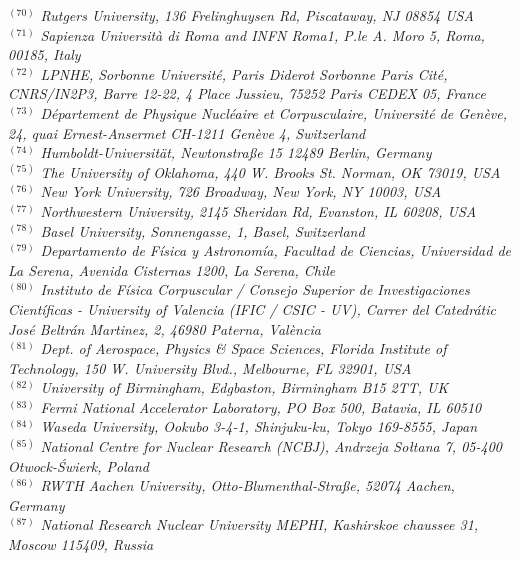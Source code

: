 {\begin{center}
$^{(70)}$ \emph{Rutgers University, 136 Frelinghuysen Rd, Piscataway, NJ 08854 USA}\\
$^{(71)}$ \emph{Sapienza Universit\`a di Roma and INFN Roma1, P.le A. Moro 5, Roma, 00185, Italy}\\
$^{(72)}$ \emph{LPNHE, Sorbonne Universit{\'e}, Paris Diderot Sorbonne Paris Cit{\'e}, CNRS/IN2P3, Barre 12-22, 4 Place Jussieu, 75252 Paris CEDEX 05, France}\\
$^{(73)}$ \emph{D\'epartement de Physique Nucl\'eaire et Corpusculaire, Universit\'e de Gen\`eve, 24, quai Ernest-Ansermet CH-1211 Gen\`eve 4, Switzerland}\\
$^{(74)}$ \emph{Humboldt-Universit\"at, Newtonstra\ss e 15 12489 Berlin, Germany}\\
$^{(75)}$ \emph{The University of Oklahoma, 440 W. Brooks St. Norman, OK 73019, USA}\\
$^{(76)}$ \emph{New York University, 726 Broadway, New York, NY 10003, USA}\\
$^{(77)}$ \emph{Northwestern University, 2145 Sheridan Rd, Evanston, IL 60208, USA}\\
$^{(78)}$ \emph{Basel University, Sonnengasse, 1, Basel, Switzerland}\\
$^{(79)}$ \emph{Departamento de F\' isica y Astronom\' ia, Facultad de Ciencias, Universidad de La Serena,  Avenida Cisternas 1200, La Serena, Chile}\\
$^{(80)}$ \emph{Instituto de F\'isica Corpuscular / Consejo Superior de Investigaciones Cient\'ificas - University of Valencia (IFIC / CSIC - UV), Carrer del Catedr\'atic Jos\'e Beltr\'an Martinez, 2, 46980 Paterna, Val\`encia}\\
$^{(81)}$ \emph{Dept. of Aerospace, Physics \& Space Sciences, Florida Institute of Technology, 150 W. University Blvd., Melbourne, FL 32901, USA}\\
$^{(82)}$ \emph{University of Birmingham, Edgbaston, Birmingham B15 2TT, UK}\\
$^{(83)}$ \emph{Fermi National Accelerator Laboratory, PO Box 500, Batavia, IL 60510}\\
$^{(84)}$ \emph{Waseda University, Ookubo 3-4-1, Shinjuku-ku, Tokyo 169-8555, Japan}\\
$^{(85)}$ \emph{National Centre for Nuclear Research (NCBJ), Andrzeja So\l{}tana 7, 05-400 Otwock-\'Swierk, Poland}\\
$^{(86)}$ \emph{RWTH Aachen University, Otto-Blumenthal-Stra\ss e, 52074 Aachen, Germany}\\
$^{(87)}$ \emph{National Research Nuclear University MEPHI,  Kashirskoe chaussee 31, Moscow 115409, Russia}\\

\end{center}}
